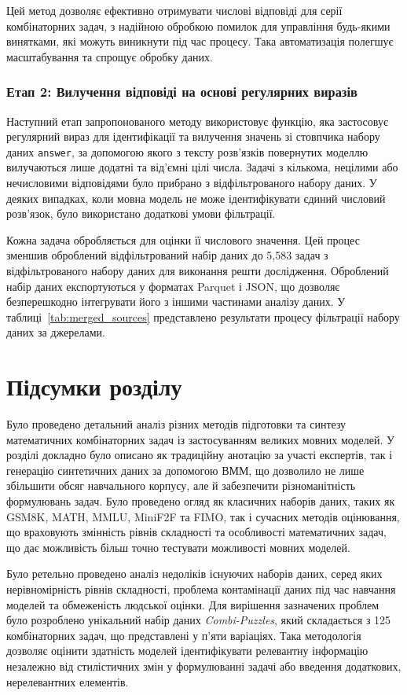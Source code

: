 Цей метод дозволяє ефективно отримувати числові відповіді для серії комбінаторних задач, з надійною обробкою помилок для управління будь-якими винятками, які можуть виникнути під час процесу. Така автоматизація полегшує масштабування та спрощує обробку даних.

\subsubsection{Етап 2: Вилучення відповіді на основі регулярних виразів}

Наступний етап запропонованого методу використовує функцію, яка застосовує регулярний вираз для ідентифікації та вилучення значень зі стовпчика набору даних \texttt{answer}, за допомогою якого з тексту розв'язків повернутих моделлю вилучаються лише додатні та від'ємні цілі числа. Задачі з кількома, нецілими або нечисловими відповідями було прибрано з відфільтрованого набору даних. У деяких випадках, коли мовна модель не може ідентифікувати єдиний числовий розв'язок, було використано додаткові умови фільтрації. 

Кожна задача обробляється для оцінки її числового значення. Цей процес зменшив оброблений відфільтрований набір даних до 5,583 задач з відфільтрованого набору даних для виконання решти дослідження. Оброблений набір даних експортуються у форматах Parquet і JSON, що дозволяє безперешкодно інтегрувати його з іншими частинами аналізу даних. У таблиці~\ref{tab:merged_sources} представлено результати процесу фільтрації набору даних за джерелами.


\section{Підсумки розділу}
Було проведено детальний аналіз різних методів підготовки та синтезу математичних комбінаторних задач із застосуванням великих мовних моделей. У розділі докладно було описано як традиційну анотацію за участі експертів, так і генерацію синтетичних даних за допомогою ВММ, що дозволило не лише збільшити обсяг навчального корпусу, але й забезпечити різноманітність формулювань задач. Було проведено огляд як класичних наборів даних, таких як GSM8K, MATH, MMLU, MiniF2F та FIMO, так і сучасних методів оцінювання, що враховують змінність рівнів складності та особливості математичних задач, що дає можливість більш точно тестувати можливості мовних моделей.

Було ретельно проведено аналіз недоліків існуючих наборів даних, серед яких нерівномірність рівнів складності, проблема контамінації даних під час навчання моделей та обмеженість людської оцінки. Для вирішення зазначених проблем було розроблено унікальний набір даних \emph{Combi-Puzzles}, який складається з 125 комбінаторних задач, що представлені у п’яти варіаціях. Така методологія дозволяє оцінити здатність моделей ідентифікувати релевантну інформацію незалежно від стилістичних змін у формулюванні задачі або введення додаткових, нерелевантних елементів.

